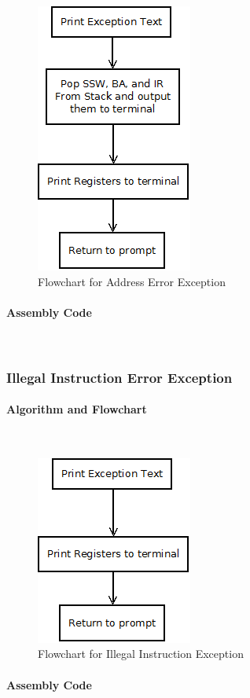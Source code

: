 \documentclass[12pt]{article}
\begin{document}
				\begin{figure}[H]
					\centering
					\includegraphics[width=0.3\linewidth]{BERR}
					\caption{Flowchart for Address Error Exception}
					\label{fig:AERR}
				\end{figure}
			\paragraph{Assembly Code}~\\			
			
			\subsubsection{Illegal Instruction Error Exception}
			\paragraph{Algorithm and Flowchart}~\\
			
			
\begin{figure}[H]
\centering
\includegraphics[width=0.3\linewidth]{Exception}
\caption{Flowchart for Illegal Instruction Exception}
\label{fig:Exception}
\end{figure}
			\paragraph{Assembly Code}~\\	
			
\end{document}

